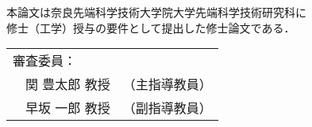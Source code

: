 \renewcommand\thepage{Title2}
\thispagestyle{empty}
\vspace*{8cm}
\begin{center}
本論文は奈良先端科学技術大学院大学先端科学技術研究科に$\ $ \\
修士（工学）授与の要件として提出した修士論文である．

 \bigskip

 \jauthor
 \vspace*{0.4cm}
 \begin{table}[h]
 \begin{center}
	\begin{tabular}[t]{p{}ll}
	 \multicolumn{2}{l}{審査委員：} \\
	 & 関 豊太郎 教授 & （主指導教員） \\
	 & 早坂 一郎 教授 & （副指導教員）
	\end{tabular}
 \end{center}
 \end{table}
 \end{center}
